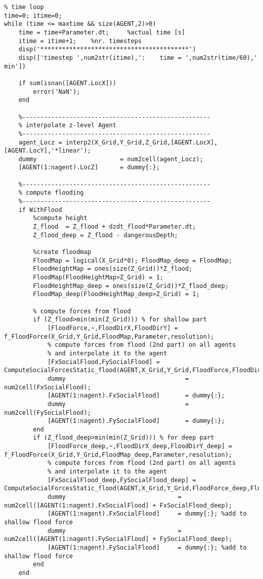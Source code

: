 \begin{lstlisting}[breaklines]
%==========================================================================
% time loop
time=0; itime=0;
while (time <= maxtime && size(AGENT,2)>0)
    time = time+Parameter.dt;     %actual time [s]
    itime = itime+1;    %nr. timesteps
    disp('*****************************************')
    disp(['timestep ',num2str(itime),':    time = ',num2str(time/60),' min'])

    if sum(isnan([AGENT.LocX]))
        error('NaN');
    end

    %----------------------------------------------------
    % interpolate z-level Agent
    %----------------------------------------------------
    agent_Locz = interp2(X_Grid,Y_Grid,Z_Grid,[AGENT.LocX],[AGENT.LocY],'*linear');
    dummy                     	= num2cell(agent_Locz);
    [AGENT(1:nagent).LocZ]  	= dummy{:};

    %----------------------------------------------------
    % compute flooding
    %----------------------------------------------------
    if WithFlood
        %compute height
        Z_flood  = Z_flood + dzdt_flood*Parameter.dt;
        Z_flood_deep = Z_flood - dangerousDepth;

        %create floodmap
        FloodMap = logical(X_Grid*0); FloodMap_deep = FloodMap;
        FloodHeightMap = ones(size(Z_Grid))*Z_flood;
        FloodMap(FloodHeightMap>Z_Grid) = 1;
        FloodHeightMap_deep = ones(size(Z_Grid))*Z_flood_deep;
        FloodMap_deep(FloodHeightMap_deep>Z_Grid) = 1;

        % compute forces from flood
        if (Z_flood>min(min(Z_Grid))) % for shallow part
            [FloodForce,~,FloodDirX,FloodDirY] = f_FloodForce(X_Grid,Y_Grid,FloodMap,Parameter,resolution);
            % compute forces from flood (2nd part) on all agents
            % and interpolate it to the agent
            [FxSocialFlood,FySocialFlood] = ComputeSocialForcesStatic_flood(AGENT,X_Grid,Y_Grid,FloodForce,FloodDirX,FloodDirY,Parameter);
            dummy                                 = num2cell(FxSocialFlood);
            [AGENT(1:nagent).FxSocialFlood]       = dummy{:};
            dummy                                 = num2cell(FySocialFlood);
            [AGENT(1:nagent).FySocialFlood]       = dummy{:};
        end
        if (Z_flood_deep>min(min(Z_Grid))) % for deep part
            [FloodForce_deep,~,FloodDirX_deep,FloodDirY_deep] = f_FloodForce(X_Grid,Y_Grid,FloodMap_deep,Parameter,resolution);
            % compute forces from flood (2nd part) on all agents
            % and interpolate it to the agent
            [FxSocialFlood_deep,FySocialFlood_deep] = ComputeSocialForcesStatic_flood(AGENT,X_Grid,Y_Grid,FloodForce_deep,FloodDirX_deep,FloodDirY_deep,Parameter);
            dummy                             	= num2cell([AGENT(1:nagent).FxSocialFlood] + FxSocialFlood_deep);
            [AGENT(1:nagent).FxSocialFlood]     = dummy{:}; %add to shallow flood force
            dummy                              	= num2cell([AGENT(1:nagent).FySocialFlood] + FySocialFlood_deep);
            [AGENT(1:nagent).FySocialFlood]     = dummy{:}; %add to shallow flood force
        end
    end


\end{lstlisting}
